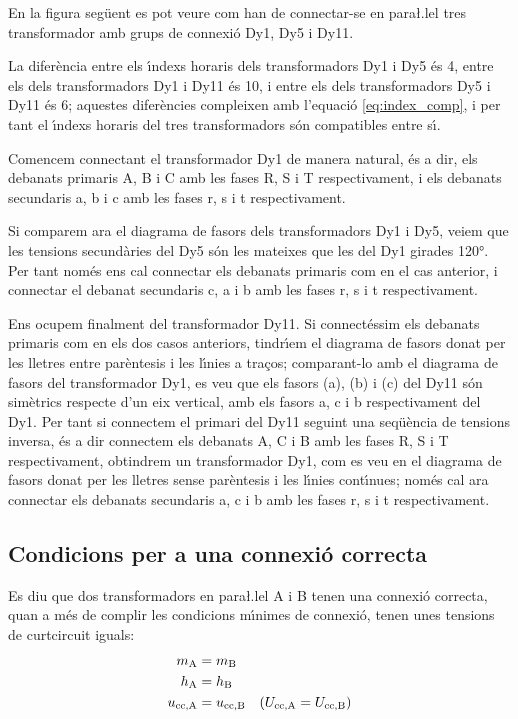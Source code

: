 \begin{exemple}
    En la figura seg\"{u}ent es pot veure com han de connectar-se en para{\l.l}el tres transformador amb grups de connexi\'{o} Dy1, Dy5 i Dy11.
    \begin{center}
        
    \end{center}

    La difer\`{e}ncia entre els \'{\i}ndexs horaris dels transformadors Dy1 i Dy5 \'{e}s 4, entre els dels transformadors Dy1 i Dy11 \'{e}s 10, i entre els dels transformadors Dy5 i Dy11 \'{e}s 6; aquestes difer\`{e}ncies compleixen amb l'equaci\'{o} \eqref{eq:index_comp}, i per tant el \'{\i}ndexs horaris del tres transformadors s\'{o}n compatibles entre s\'{\i}.


    Comencem connectant el  transformador Dy1 de manera natural, \'{e}s a dir, els debanats primaris A, B i C amb les fases R, S i T respectivament, i els debanats secundaris a, b i c amb les fases r, s i t respectivament.

    Si comparem ara el diagrama de fasors dels transformadors Dy1 i Dy5, veiem que les tensions secund\`{a}ries del Dy5 s\'{o}n les mateixes que les del Dy1 girades \ang{120}. Per tant nom\'{e}s ens cal connectar els debanats primaris com en el cas anterior, i connectar el debanat secundaris c, a i b amb les fases r, s i t respectivament.

    Ens ocupem finalment del transformador Dy11. Si connect\'{e}ssim els debanats primaris com en els dos casos anteriors, tindr\'{\i}em el diagrama de fasors donat per les lletres entre par\`{e}ntesis i les l\'{\i}nies a tra\c{c}os; comparant-lo amb el diagrama de fasors del transformador Dy1, es veu que els fasors (a), (b) i (c) del Dy11 s\'{o}n sim\`{e}trics respecte d'un eix vertical, amb els fasors a, c i b respectivament del Dy1. Per tant si connectem el primari del Dy11 seguint una seq\"{u}\`{e}ncia de tensions inversa, \'{e}s a dir connectem els debanats A, C i B amb les fases R, S i T respectivament, obtindrem un transformador Dy1, com es veu en el diagrama de fasors donat per les lletres sense par\`{e}ntesis i les l\'{\i}nies cont\'{\i}nues; nom\'{e}s cal ara connectar els debanats secundaris a, c i b amb les fases r, s i t respectivament.
\end{exemple}

\subsection{Condicions per a una connexi\'{o} correcta}
 Es diu que dos transformadors en para{\l.l}el  A i B tenen una connexi\'{o} correcta, quan a m\'{e}s de complir les condicions m\'{\i}nimes de connexi\'{o}, tenen unes tensions de curtcircuit iguals:
\begin{align}
    m_\mathrm{A} &= m_\mathrm{B}\\
    h_\mathrm{A} &= h_\mathrm{B}\\
    u_\mathrm{cc,A} &= u_\mathrm{cc,B} \quad (U_\mathrm{cc,A} = U_\mathrm{cc,B})
\end{align}

